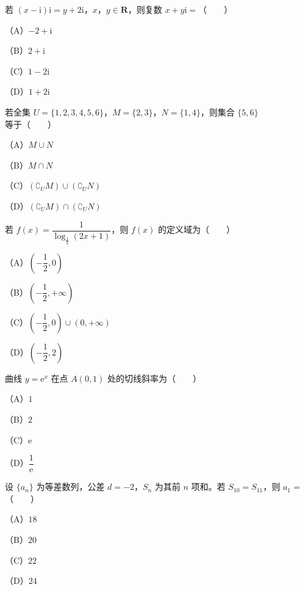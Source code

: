 

\begin{question}
若 $(x-\mathrm i)\mathrm i=y+2\mathrm i$，$x$，$y\in\mathbf R$，则复数 $x+y\mathrm i=$\mbox{（　　）}

（A）$-2+\mathrm i$

（B）$2+\mathrm i$

（C）$1-2\mathrm i$

（D）$1+2\mathrm i$

\end{question}
\begin{question}
若全集 $U=\{1,2,3,4,5,6\}$，$M=\{2,3\}$，$N=\{1,4\}$，则集合 $\{5,6\}$ 等于\mbox{（　　）}

（A）$M\cup N$

（B）$M\cap N$

（C）$(\complement_UM)\cup(\complement_UN)$

（D）$(\complement_UM)\cap(\complement_UN)$

\end{question}
\begin{question}
若 $f(x)=\dfrac1{\log_{\frac12}(2x+1)}$，则 $f(x)$ 的定义域为\mbox{（　　）}

（A）$\left(-\dfrac12,0\right)$

（B）$\left(-\dfrac12,+\infty\right)$

（C）$\left(-\dfrac12,0\right)\cup(0,+\infty)$

（D）$\left(-\dfrac12,2\right)$

\end{question}
\begin{question}
曲线 $y=\mathrm e^x$ 在点 $A(0,1)$ 处的切线斜率为\mbox{（　　）}

（A）$1$

（B）$2$

（C）$\mathrm e$

（D）$\dfrac1{\mathrm e}$

\end{question}
\begin{question}
设 $\{a_n\}$ 为等差数列，公差 $d=-2$，$S_n$ 为其前 $n$ 项和。若 $S_{10}=S_{11}$，则 $a_1=$\mbox{（　　）}

（A）$18$

（B）$20$

（C）$22$

（D）$24$

\end{question}
